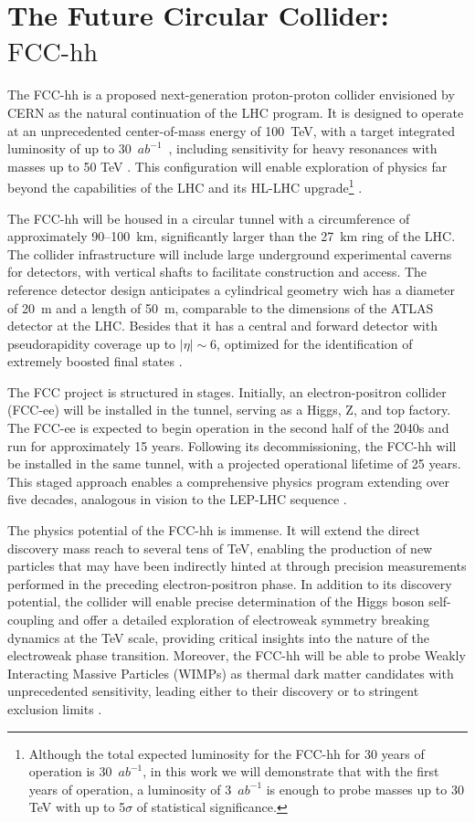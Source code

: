 \documentclass[aps,prev,twocolumn,preprintnumbers,floatfix,nofootinbib]{revtex4-1}
\begin{document}
\section{The Future Circular Collider: $\text{FCC-hh}$}
\label{fcchh}

The FCC-hh is a proposed next-generation proton-proton collider envisioned by CERN as the natural continuation of the LHC program. It is designed to operate at an unprecedented center-of-mass energy of 100~TeV, with a target integrated luminosity of up to 30~$ab^{-1}$~\cite{FCC:2018vvp}, including sensitivity for heavy resonances with masses up to 50 TeV \cite{Helsens:2019bfw}. This configuration will enable exploration of physics far beyond the capabilities of the LHC and its HL-LHC upgrade\footnote{Although the total expected luminosity for the FCC-hh for 30 years of operation is 30~$ab^{-1}$, in this work we will demonstrate that with the first years of operation, a luminosity of 3~$ab^{-1}$ is enough to probe masses up to 30 TeV with up to 5$\sigma$ of statistical significance.} \cite{FCC:2025lpp}. 

The FCC-hh will be housed in a circular tunnel with a circumference of approximately 90--100~km, significantly larger than the 27~km ring of the LHC. The collider infrastructure will include large underground experimental caverns for detectors, with vertical shafts to facilitate construction and access. The reference detector design anticipates a cylindrical geometry wich has a diameter of 20~m and a length of 50~m, comparable to the dimensions of the ATLAS detector at the LHC. Besides that it has a central and forward detector with pseudorapidity coverage up to $|\eta| \sim 6$, optimized for the identification of extremely boosted final states \cite{FCC:2025uan}. 

The FCC project is structured in stages. Initially, an electron-positron collider (FCC-ee) will be installed in the tunnel, serving as a Higgs, Z, and top factory. The FCC-ee is expected to begin operation in the second half of the 2040s and run for approximately 15 years. Following its decommissioning, the FCC-hh will be installed in the same tunnel, with a projected operational lifetime of 25 years. This staged approach enables a comprehensive physics program extending over five decades, analogous in vision to the LEP-LHC sequence \cite{FCC:2025jtd}. 

The physics potential of the FCC-hh is immense. It will extend the direct discovery mass reach to several tens of TeV, enabling the production of new particles that may have been indirectly hinted at through precision measurements performed in the preceding electron-positron phase. In addition to its discovery potential, the collider will enable precise determination of the Higgs boson self-coupling and offer a detailed exploration of electroweak symmetry breaking dynamics at the TeV scale, providing critical insights into the nature of the electroweak phase transition. Moreover, the FCC-hh will be able to probe Weakly Interacting Massive Particles (WIMPs) as thermal dark matter candidates with unprecedented sensitivity, leading either to their discovery or to stringent exclusion limits \cite{FCC:2018byv}. 
\end{document}
